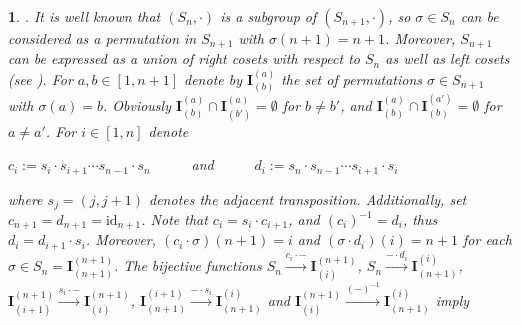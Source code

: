 \documentclass[a4 paper,12pt]{article}
\newtheorem{numeris}{}[section]
\begin{document}
\begin{numeris}.  It is well known that   $(S_{n}, \cdot )$ is a subgroup of $(S_{n+1}, \cdot )$, so  $\sigma\in S_{n}$ can be considered  as a permutation in  $S_{n+1}$ with $\sigma(n+1) = n+1$. Moreover, $S_{n+1}$ can be expressed as a union of right cosets with respect to $S_n$ as well as left cosets  (see \cite[Chapter 4,5]{Humphreys}). For   $a,b\in \left[1,n+1\right]$  denote by $\textbf{I}_{(b)}^{(a)}$ the set of permutations $\sigma\in S_{n+1}$ with $\sigma(a)=b$.  Obviously  $\textbf{I}_{(b)}^{(a)}\cap \textbf{I}_{(b')}^{(a)} = \emptyset$  for $b\neq b'$,  and  $\textbf{I}_{(b)}^{(a)}\cap \textbf{I}_{(b)}^{(a')} = \emptyset$ for $a\neq a'$.  
For  $i\in \left[1,n\right]$ denote 

  
\begin{center}
$c_{i}:= s_{i}\cdot  s_{i+1}\cdots  s_{n-1} \cdot  s_{n} $  
 \  \  \  \  \  and  \  \  \   \  \   $d_{i}:=s_{n}\cdot  s_{n-1}\cdots  s_{i+1}\cdot  s_{i} $ 
\end{center}
where $s_{j}=(j,j+1)$ denotes the adjacent transposition. Additionally, set $c_{n+1}=d_{n+1}=\textrm{id}_{n+1}$.
 Note that  $c_{i}= s_{i}\cdot  c_{i+1}$, and $(c_{i})^{-1} = d_i$, thus $d_{i}= d_{i+1}\cdot  s_{i}$.  Moreover,   $(c_{i}\cdot  \sigma)(n+1)=i $   and     $(\sigma \cdot  d_{i})(i)=n+1 $ for each  $\sigma\in S_n=\textbf{I}_{(n+1)}^{(n+1)}$. The bijective functions $S_n \xrightarrow{c_{i}\cdot  -} \textbf{I}_{(i)}^{(n+1)}$,  $S_n \xrightarrow{ -\cdot  d_{i}} \textbf{I}^{(i)}_{(n+1)}$,  
 $\textbf{I}_{(i+1)}^{(n+1)}\xrightarrow{s_{i}\cdot  -} \textbf{I}_{(i)}^{(n+1)}$,  $\textbf{I}^{(i+1)}_{(n+1)}\xrightarrow{ -\cdot  s_{i}} \textbf{I}^{(i)}_{(n+1)}$ and   $\textbf{I}_{(i)}^{(n+1)} \xrightarrow{ (-)^{-1}}  \textbf{I}^{(i)}_{(n+1)}$ imply


\end{numeris}
\end{document}
